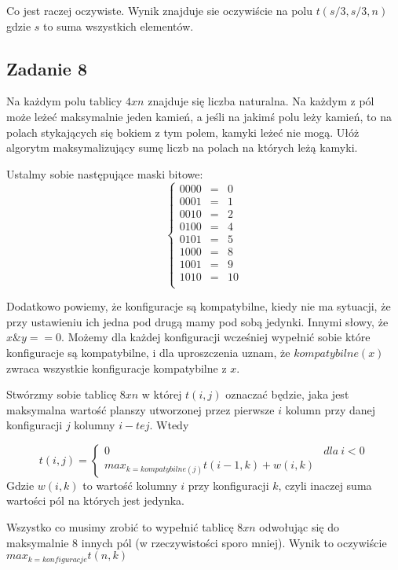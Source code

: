 \documentclass[a4paper]{article}
\begin{document}
Co jest raczej oczywiste. Wynik znajduje sie oczywiście na polu $t(s/3,s/3,n)$ gdzie $s$ to suma wszystkich elementów.
\clearpage
\subsection*{Zadanie 8}
Na każdym polu tablicy $4xn$ znajduje się liczba naturalna. Na każdym z pól może leżeć maksymalnie jeden kamień, a jeśli na jakimś polu leży kamień, to na polach stykających się bokiem z tym polem, kamyki leżeć nie mogą. Ułóż algorytm maksymalizujący sumę liczb na polach na których leżą kamyki.

Ustalmy sobie następujące maski bitowe:
$$\left\{\begin{matrix}
0000 & = & 0\\ 
0001 & = & 1\\
0010 & = & 2\\
0100 & = & 4\\
0101 & = & 5\\
1000 & = & 8\\
1001 & = & 9\\
1010 & = & 10\\
\end{matrix}\right.$$

Dodatkowo powiemy, że konfiguracje są kompatybilne, kiedy nie ma sytuacji, że przy ustawieniu ich jedna pod drugą mamy pod sobą jedynki. Innymi słowy, że $x\&y==0$.
Możemy dla każdej konfiguracji wcześniej wypełnić sobie które konfiguracje są kompatybilne, i dla uproszczenia uznam, że $kompatybilne(x)$ zwraca wszystkie konfiguracje kompatybilne z $x$.

Stwórzmy sobie tablicę $8xn$ w której $t(i,j)$ oznaczać będzie, jaka jest maksymalna wartość planszy utworzonej przez pierwsze $i$ kolumn przy danej konfiguracji $j$ kolumny $i-tej$. Wtedy 

$$t(i,j) = \left\{\begin{matrix}
0 & dla\ i<0\\
max_{k=kompatybilne(j)} t(i-1,k)+w(i,k)  
\end{matrix}\right.$$
Gdzie $w(i,k)$ to wartość kolumny $i$ przy konfiguracji $k$, czyli inaczej suma wartości pól na których jest jedynka.

Wszystko co musimy zrobić to wypełnić tablicę $8xn$ odwołując się do maksymalnie $8$ innych pól (w rzeczywistości sporo mniej). Wynik to oczywiście $max_{k=konfiguracje} t(n,k)$
\end{document}
